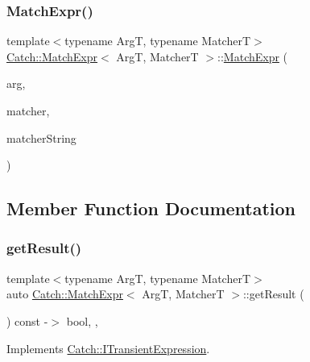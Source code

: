 \subsubsection{\texorpdfstring{Match\+Expr()}{MatchExpr()}}
{\footnotesize\ttfamily template$<$typename ArgT, typename MatcherT$>$ \\
\mbox{\hyperlink{classCatch_1_1MatchExpr}{Catch\+::\+Match\+Expr}}$<$ ArgT, MatcherT $>$\+::\mbox{\hyperlink{classCatch_1_1MatchExpr}{Match\+Expr}} (\begin{DoxyParamCaption}\item[{ArgT const \&}]{arg,  }\item[{MatcherT const \&}]{matcher,  }\item[{\mbox{\hyperlink{classCatch_1_1StringRef}{String\+Ref}}}]{matcher\+String }\end{DoxyParamCaption})\hspace{0.3cm}{\ttfamily [inline]}}



\subsection{Member Function Documentation}
\mbox{\label{classCatch_1_1MatchExpr_a61faf50ec55387909a9ff8520ebd0818}} 
\subsubsection{\texorpdfstring{get\+Result()}{getResult()}}
{\footnotesize\ttfamily template$<$typename ArgT, typename MatcherT$>$ \\
auto \mbox{\hyperlink{classCatch_1_1MatchExpr}{Catch\+::\+Match\+Expr}}$<$ ArgT, MatcherT $>$\+::get\+Result (\begin{DoxyParamCaption}{ }\end{DoxyParamCaption}) const -\/$>$ bool\hspace{0.3cm}{\ttfamily [inline]}, {\ttfamily [override]}, {\ttfamily [virtual]}}



Implements \mbox{\hyperlink{structCatch_1_1ITransientExpression_ade7e988c982fd6befc47c7154ca0ec6b}{Catch\+::\+I\+Transient\+Expression}}.

\mbox{\label{classCatch_1_1MatchExpr_a932628935e0b257fcccec3d9cad58ffe}} 
